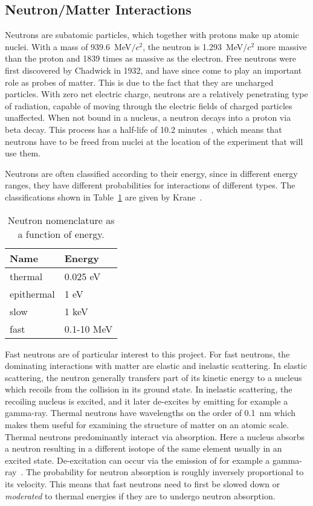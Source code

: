 \documentclass[main.tex]{subfiles}
\begin{document}
\subsection{Neutron/Matter Interactions}\label{sec:neutronMatterInteractions}
Neutrons are subatomic particles, which together with protons make up atomic nuclei. With a mass of \SI{939.6}{\MeV}$/c^\textrm{2}$, the neutron is \SI{1.293}{\MeV}$/c^\textrm{2}$ more massive than the proton and 1839 times as massive as the electron. 
Free neutrons were first discovered by Chadwick in 1932, and have since come to play an important role as probes of matter. This is due to the fact that they are uncharged particles. With zero net electric charge, neutrons are a relatively penetrating type of radiation, capable of moving through the electric fields of charged particles unaffected. When not bound in a nucleus, a neutron decays into a proton via beta decay. This process has a half-life of 10.2 minutes~\cite{Nudat}, which means that neutrons have to be freed from nuclei at the location of the experiment that will use them.

Neutrons are often classified according to their energy, since in different energy ranges, they have different probabilities for interactions of different types. The classifications shown in Table~\ref{tab:neutron} are given by Krane~\cite{Krane}. 
\begin{table}[h]
\center
\begin{tabular}{|l|l|}
\hline
Name & Energy \\ \hline
thermal       & 0.025 eV        \\ \hline
epithermal    & 1 eV            \\ \hline
slow          & 1 keV           \\ \hline
fast          & 0.1-10 MeV      \\ \hline
\end{tabular}
\caption[Neutron nomenclature as a function of energy.]{Neutron nomenclature as a function of energy.}
\label{tab:neutron}
\end{table}
Fast neutrons are of particular interest to this project. For fast neutrons, the dominating interactions with matter are elastic and inelastic scattering. In elastic scattering, the neutron generally transfers part of its kinetic energy to a nucleus which recoils from the collision in its ground state. In inelastic scattering, the recoiling nucleus is excited, and it later de-excites by emitting for example a gamma-ray. Thermal neutrons have wavelengths on the order of \SI{0.1}{nm} which makes them useful for examining the structure of matter on an atomic scale. 
Thermal neutrons predominantly interact via absorption. Here a nucleus absorbs a neutron resulting in a different isotope of the same element usually in an excited state. De-excitation can occur via the emission of for example a gamma-ray~\cite{Leo}. The probability for neutron absorption is roughly inversely proportional to its velocity. This means that fast neutrons need to first be slowed down or \textit{moderated} to thermal energies if they are to undergo neutron absorption. 
\end{document}
